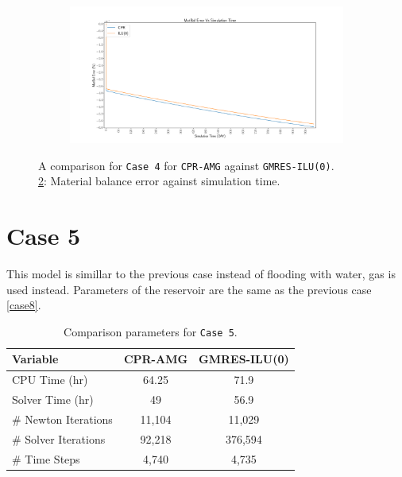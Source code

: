 \begin{figure}
\centering
\begin{subfigure}[b]{\textwidth}
   \includegraphics[width=1\linewidth]{figures/case8/matbalerr_time.pdf}
   \caption{}
   \label{case4_matbalerr}
\end{subfigure}

\caption[caption]{A comparison for \texttt{Case 4} for \texttt{CPR-AMG} against \texttt{GMRES-ILU(0)}.\\\hspace{\textwidth}
	\cref{case4_matbalerr}: Material balance error against simulation time. \\\hspace{\textwidth}}
\end{figure}


\section{Case 5}
This model is simillar to the previous case instead of flooding with water, gas is used instead. Parameters of the reservoir
are the same as the previous case \ref{case8}.

\begin{table}[h!]
   \caption{Comparison parameters for \texttt{Case 5}.}
   \label{case9-tab}
   \small
   \centering
   \begin{tabular}{lcc}
   \toprule\toprule
   \textbf{Variable} & \textbf{CPR-AMG} & \textbf{GMRES-ILU(0)} \\
   \midrule
   CPU Time (hr) & 64.25 &  71.9 \\
   Solver Time (hr) & 49 & 56.9 \\
   \# Newton Iterations & 11,104 & 11,029 \\
   \# Solver Iterations & 92,218 & 376,594 \\
   \# Time Steps & 4,740 & 4,735 \\
   \bottomrule
   \end{tabular}
\end{table}

